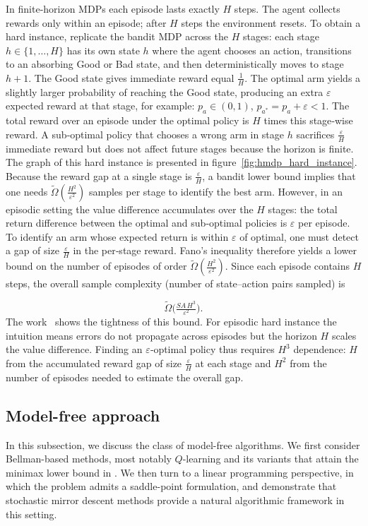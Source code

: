 \documentclass{article}
\numberwithin{equation}{section}
\renewcommand{\epsilon}{\varepsilon}
\begin{document}
In finite‑horizon MDPs each episode lasts exactly $H$ steps. The agent collects rewards only within an episode; after $H$ steps the environment resets. To obtain a hard instance, replicate the bandit MDP across the $H$ stages: each stage $h\in\{1,\dots,H\}$ has its own state $h$ where the agent chooses an action, transitions to an absorbing Good or Bad state, and then deterministically moves to stage $h+1$. {The Good state gives immediate reward equal $\frac{1}{H}$.} The optimal arm yields a slightly larger probability of reaching the Good state, producing an extra {$\epsilon$} expected reward at that stage{, for example: $p_a\in (0, 1)$, $p_{a^*} = p_a + \epsilon < 1$}. The total reward over an episode under the optimal policy is $H$ times this stage‑wise reward. A sub‑optimal policy that chooses a wrong arm in stage $h$ sacrifices {$\frac{\epsilon}{H}$} immediate reward but does not affect future stages because the horizon is finite. The graph of this hard instance is presented in figure~\ref{fig:hmdp_hard_instance}. Because the reward gap at a single stage is {$\frac{\epsilon}{H}$}, a bandit lower bound implies that one needs {$\widetilde{\Omega}\left(\frac{H^2}{\epsilon^2}\right)$} samples per stage to identify the best arm. However, in an episodic setting the value difference accumulates over the $H$ stages: the total return difference between the optimal and sub‑optimal policies is {$\epsilon$} per episode. To identify an arm whose expected return is within $\epsilon$ of optimal, one must detect a gap of size {$\tfrac{\epsilon}{H}$} in the per‑stage reward. Fano’s inequality therefore yields a lower bound on the number of episodes of order {$\widetilde{\Omega}\left(\tfrac{H^2}{\epsilon^2}\right)$}. Since each episode contains $H$ steps, the overall sample complexity (number of state–action pairs sampled) is

$$\widetilde{\Omega}\bigl(\tfrac{SA\,H^{3}}{\epsilon^{2}}\bigr).$$
The work~\cite{sidford2018near} shows the tightness of this bound. For episodic hard instance the intuition means errors do not propagate across episodes but the horizon $H$ scales the value difference. Finding an $\epsilon$‑optimal policy thus requires $H^3$ dependence: {$H$ from the accumulated reward gap of size $\tfrac{\epsilon}{H}$ at each stage and $H^2$ from the number of episodes needed to estimate the overall gap.}

\subsection{Model-free approach}\label{subseq:model_free}
In this subsection, we discuss the class of model-free algorithms. We first consider Bellman-based methods, most notably $Q$-learning and its variants that attain the minimax lower bound in {\cite{gheshlaghi2013minimax}}. We then turn to a linear programming perspective, in which the problem admits a saddle-point formulation, and demonstrate that stochastic mirror descent methods provide a natural algorithmic framework in this setting.
\end{document}
